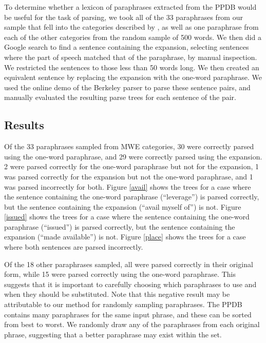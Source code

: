 \documentclass[11pt]{article}
\begin{document}
To determine whether a lexicon of paraphrases extracted from the PPDB would be useful for the task of parsing, we took all of the 33 paraphrases from our sample that fell into the categories described by , as well as one paraphrase from each of the other categories from the random sample of 500 words. We then did a Google search to find a sentence containing the expansion, selecting sentences where the part of speech matched that of the paraphrase, by manual inspection. We restricted the sentences to those less than 50 words long. We then created an equivalent sentence by replacing the expansion with the one-word paraphrase. We used the online demo of the Berkeley parser \cite{petrov-EtAl:2006:COLACL} to parse these sentence pairs, and manually evaluated the resulting parse trees for each sentence of the pair.

\subsection{Results}

Of the 33 paraphrases sampled from MWE categories, 30 were correctly parsed using the one-word paraphrase, and 29 were correctly parsed using the expansion. 2 were parsed correctly for the one-word paraphrase but not for the expansion, 1 was parsed correctly for the expansion but not the one-word paraphrase, and 1 was parsed incorrectly for both. Figure \ref{avail} shows the trees for a case where the sentence containing the one-word paraphrase (``leverage'') is parsed correctly, but the sentence containing the expansion (``avail myself of'') is not. Figure \ref{issued} shows the trees for a case where the sentence containing the one-word paraphrase (``issued'') is parsed correctly, but the sentence containing the expansion (``made available'') is not. Figure \ref{place} shows the trees for a case where both sentences are parsed incorrectly.

Of the 18 other paraphrases sampled, all were parsed correctly in their original form, while 15 were parsed correctly using the one-word paraphrase.  This suggests that it is important to carefully choosing which paraphrases to use and when they should be substituted.  Note that this negative result may be attributable to our method for randomly sampling paraphrases.  The PPDB contains many paraphrases for the same input phrase, and these can be sorted from best to worst.  We randomly draw any of the paraphrases from each original phrase, suggesting that a better paraphrase may exist within the set.
\end{document}
